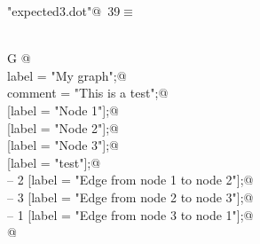 \documentclass[a4paper]{report}
\begin{document}
\begin{flushleft}
\begin{minipage}{\linewidth}
\begin{list}{}{\setlength{\itemsep}{-\parsep}\setlength{\itemindent}{-\leftmargin}}
\item{}
\end{list}
\end{minipage}\vspace{4ex}
\end{flushleft}
\begin{flushleft} \small
\begin{minipage}{\linewidth}\label{scrap39}\raggedright\small
{} \verb@"expected3.dot"@\nobreak\ {\footnotesize {39}}$\equiv$
\vspace{-1ex}
\begin{list}{}{} \item
\mbox{}\verb@@\\
\mbox{}\verb@graph G {@\\
\mbox{}\verb@        label = "My graph";@\\
\mbox{}\verb@        comment = "This is a test";@\\
\mbox{} [label = "Node 1"];@\\
\mbox{} [label = "Node 2"];@\\
\mbox{} [label = "Node 3"];@\\
\mbox{} [label = "test"];@\\
\mbox{} -- 2 [label = "Edge from node 1 to node 2"];@\\
\mbox{} -- 3 [label = "Edge from node 2 to node 3"];@\\
\mbox{} -- 1 [label = "Edge from node 3 to node 1"];@\\
\mbox{}\verb@}@\\
\mbox{}\verb@@{\NWsep}
\end{list}
\vspace{-1.5ex}
\footnotesize
\begin{list}{}{\setlength{\itemsep}{-\parsep}\setlength{\itemindent}{-\leftmargin}}

\item{}
\end{list}
\end{minipage}\vspace{4ex}
\end{flushleft}
\newpage
\end{document}
